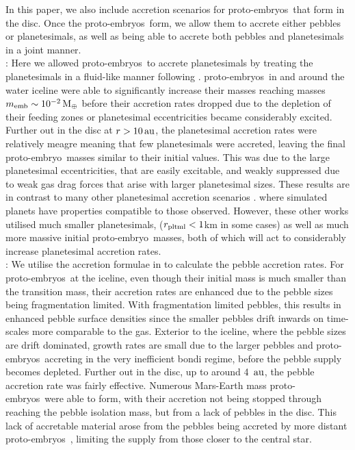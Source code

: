 \documentclass[a4paper,fleqn,usenatbib]{mnras}
\newcommand{\me}{{\, {\rm M}_{\oplus}}}
\newcommand{\au}{{\, {\rm au}}}
\newcommand{\emb}{{{proto-embryo~}}}
\newcommand{\embs}{{{proto-embryos~}}}
\begin{document}
In this paper, we also include accretion scenarios for \embs that form in the disc.
Once the \embs form, we allow them to accrete either pebbles or planetesimals, as well as being able to accrete both pebbles and planetesimals in a joint manner.\\
: Here we allowed \embs to accrete planetesimals by treating the planetesimals in a fluid-like manner following \citet{Fortier13}.
\embs in and around the water iceline were able to significantly increase their masses reaching masses $m_{\rm emb}\sim 10^{-2}\me$ before their accretion rates dropped due to the depletion of their feeding zones or planetesimal eccentricities became considerably excited.
Further out in the disc at $r>10\au$, the planetesimal accretion rates were relatively meagre meaning that few planetesimals were accreted, leaving the final \emb masses similar to their initial values.
This was due to the large planetesimal eccentricities, that are easily excitable, and weakly suppressed due to weak gas drag forces that arise with larger planetesimal sizes.
These results are in contrast to many other planetesimal accretion scenarios \citep[e.g.][]{Alibert2006,Ida13,Mordasini15,ColemanNelson14,ColemanNelson16,ColemanNelson16b}. where simulated planets have properties compatible to those observed.
However, these other works utilised much smaller planetesimals, ($r_{\rm pltml}<1$km in some cases) as well as much more massive initial \emb masses, both of which will act to considerably increase planetesimal accretion rates.\\
: We utilise the accretion formulae in \cite{Johansen17} to calculate the pebble accretion rates.
For \embs at the iceline, even though their initial mass is much smaller than the transition mass, their accretion rates are enhanced due to the pebble sizes being fragmentation limited.
With fragmentation limited pebbles, this results in enhanced pebble surface densities since the smaller pebbles drift inwards on time-scales more comparable to the gas.
Exterior to the iceline, where the pebble sizes are drift dominated, growth rates are small due to the larger pebbles and \embs accreting in the very inefficient bondi regime, before the pebble supply becomes depleted.
Further out in the disc, up to around 4 $\au$, the pebble accretion rate was fairly effective.
Numerous Mars-Earth mass \embs were able to form, with their accretion not being stopped through reaching the pebble isolation mass, but from a lack of pebbles in the disc.
This lack of accretable material arose from the pebbles being accreted by more distant \embs, limiting the supply from those closer to the central star.
\end{document}
